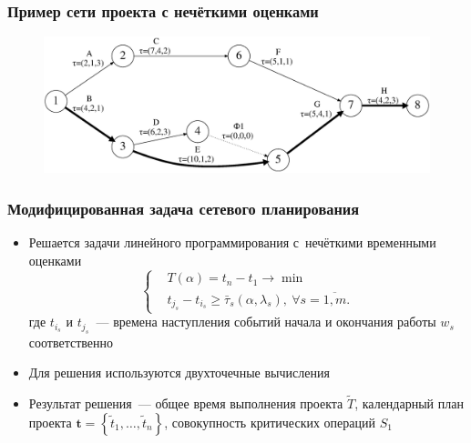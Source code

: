 \documentclass[12pt]{beamer}
\begin{document}
\begin{frame}
  \frametitle{Пример сети проекта с нечёткими оценками}
  \begin{figure}
    \center
    \includegraphics[width=\textwidth]{pplan}
  \end{figure}
\end{frame}

\begin{frame}
  \frametitle{Модифицированная задача сетевого планирования}
  \begin{itemize}
    \item Решается задачи линейного программирования с~нечёткими временными оценками
      \begin{equation}
      \label{eq:modified-fcpm-lp}
        \left\{ \begin{aligned}
          & T(\alpha )=t_n-t_1\to \min  \\ 
          & t_{j_s}-t_{i_s}\geqslant \bar{\tau}_s\left(\alpha,\lambda_s \right),\ \forall s=\overline{1,m}.
        \end{aligned} \right.
      \end{equation}
      где $t_{i_s}$ и $t_{j_s}$~--- времена наступления событий начала и окончания работы $w_s$ соответственно
    \item Для решения используются двухточечные вычисления
    \item Результат решения~--- общее время выполнения проекта $\tilde T$, календарный план проекта $\mathbf{t}=\left\{\tilde t_1, \ldots, \tilde t_n \right\}$, совокупность критических операций $S_1$
  \end{itemize}
\end{frame}
\end{document}
